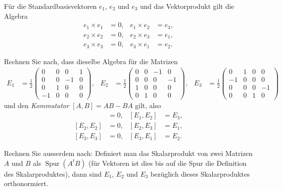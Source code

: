 Für die Standardbasisvektoren $e_1$, $e_2$ und $e_3$ und das Vektorprodukt
gilt die Algebra
\begin{align*}
e_1\times e_1&=0,&
e_1\times e_2&=e_3,\\
e_2\times e_2&=0,&
e_2\times e_3&=e_1,\\
e_3\times e_3&=0,&
e_3\times e_1&=e_2.
\end{align*}
\begin{teilaufgaben}
\item
Rechnen Sie nach, dass dieselbe Algebra für die Matrizen
\begin{align*}
E_1&=\frac12\begin{pmatrix}
 0& 0& 0& 1\\
 0& 0&-1& 0\\
 0& 1& 0& 0\\
-1& 0& 0& 0
\end{pmatrix},
&
E_2&=\frac12\begin{pmatrix}
 0& 0&-1& 0\\
 0& 0& 0&-1\\
 1& 0& 0& 0\\
 0& 1& 0& 0
\end{pmatrix},
&
E_3&=\frac12\begin{pmatrix}
 0& 1& 0& 0\\
-1& 0& 0& 0\\
 0& 0& 0&-1\\
 0& 0& 1& 0
\end{pmatrix}
&
\end{align*}
und den {\em Kommutator} $[A,B]=AB-BA$ gilt, also
\begin{align*}
[E_1, E_1]&=0,&
[E_1, E_2]&=E_3,\\
[E_2, E_2]&=0,&
[E_2, E_3]&=E_1,\\
[E_3, E_3]&=0,&
[E_3, E_1]&=E_2.
\end{align*}
\item
Rechnen Sie ausserdem nach:
Definiert man das Skalarprodukt von zwei Matrizen $A$ und $B$ als
$\operatorname{Spur}(A^tB)$
(für Vektoren ist dies bis auf die Spur die Definition des Skalarproduktes),
dann sind $E_1$, $E_2$
und $E_3$ bezüglich dieses Skalarproduktes orthonormiert.
\end{teilaufgaben}


